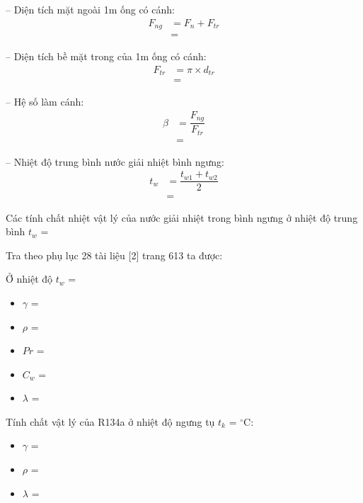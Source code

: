 -- Diện tích mặt ngoài 1m ống có cánh:
\begin{equation*}
	\begin{split}
		F_{ng} &= F_{n} + F_{tr}\\
		&= 
	\end{split}
\end{equation*}

-- Diện tích bề mặt trong của 1m ống có cánh:
\begin{equation*}
	\begin{split}
		F_{tr} &= \pi\times d_{tr}\\
		&= 
	\end{split}
\end{equation*}	

-- Hệ số làm cánh:
\begin{equation*}
	\begin{split}
		\beta &= \dfrac{F_{ng}}{F_{tr}}\\
		&= 
	\end{split}
\end{equation*}	

-- Nhiệt độ trung bình nước giải nhiệt bình ngưng:
\begin{equation*}
	\begin{split}
		t_{w} &= \dfrac{t_{w1} + t_{w2}}{2}\\
		&= 
	\end{split}
\end{equation*}	

Các tính chất nhiệt vật lý của nước giải nhiệt trong bình ngưng ở nhiệt độ trung bình $t_{w}$ = 

Tra theo phụ lục 28 tài liệu [2] trang 613 ta được:

Ở nhiệt độ $ t_{w} $ = 
\begin{multicols}{2}
\begin{itemize}
	\item $\gamma$ =  
	\item $\rho$ =  
	\item $Pr$ =  	
	\item $C_{w}$ =  	
	\item $\lambda$ =  	
\end{itemize}
\end{multicols}

Tính chất vật lý của R134a ở nhiệt độ ngưng tụ $ t_{k} $ = $^{\circ}$C:
\begin{itemize}
	\item $\gamma$ =
	\item $\rho$ =
	\item $\lambda$ =
\end{itemize}

